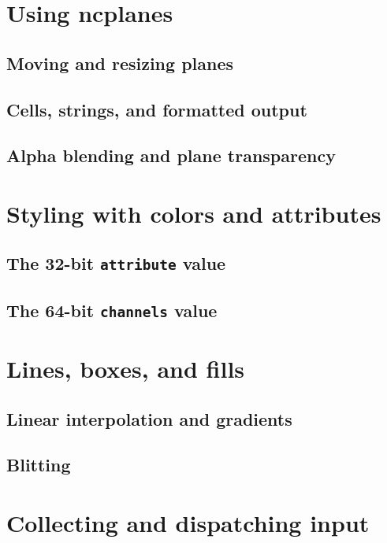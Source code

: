 \documentclass[letterpaper,10pt]{article}
\begin{document}
\newpage
\section{Using ncplanes}
\label{ncplane}
\subsection{Moving and resizing planes}
\subsection{Cells, strings, and formatted output}
\subsection{Alpha blending and plane transparency}

\section{Styling with colors and attributes}
\subsection{The 32-bit \texttt{attribute} value}
\subsection{The 64-bit \texttt{channels} value}

\section{Lines, boxes, and fills}
\subsection{Linear interpolation and gradients}
\subsection{Blitting}

\section{Collecting and dispatching input}
\end{document}
